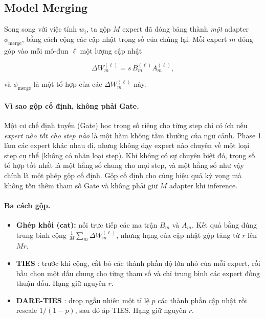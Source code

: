 \documentclass[12pt,a4paper]{article}
\newcommand{\pmerge}{\phi_{\mathrm{merge}}}
\begin{document}
\subsection{Model Merging}
\label{sec:merging}

Song song với việc tính $w_i$, ta gộp $M$ expert đã đóng băng thành \emph{một} adapter $\pmerge$, bằng cách cộng các cập nhật trọng số của chúng lại. Mỗi expert $m$ đóng góp vào mỗi mô-đun $\ell$ một lượng cập nhật

\begin{equation}
\label{eq:deltaw}
\Delta W_m^{(\ell)} = s\, B_m^{(\ell)} A_m^{(\ell)},
\end{equation}

và $\pmerge$ là một tổ hợp của các $\Delta W_m^{(\ell)}$ này.

\paragraph{Vì sao gộp cố định, không phải Gate.}
Một cơ chế định tuyến (Gate) học trọng số riêng cho từng step chỉ có ích nếu \emph{expert nào tốt cho step nào} là một hàm không tầm thường của ngữ cảnh. Phase 1 làm các expert khác nhau đi, nhưng không dạy expert nào chuyên về một loại step cụ thể (không có nhãn loại step). Khi không có sự chuyên biệt đó, trọng số tổ hợp tốt nhất là một hằng số chung cho mọi step, và một hằng số như vậy chính là một phép gộp cố định. Gộp cố định cho cùng hiệu quả kỳ vọng mà không tốn thêm tham số Gate và không phải giữ $M$ adapter khi inference.

\paragraph{Ba cách gộp.}
\begin{itemize}
\item \textbf{Ghép khối (cat):} nối trực tiếp các ma trận $B_m$ và $A_m$. Kết quả bằng đúng trung bình cộng $\frac{1}{M}\sum_m \Delta W_m^{(\ell)}$, nhưng hạng của cập nhật gộp tăng từ $r$ lên $Mr$.
\item \textbf{TIES} \cite{yadav2023ties}: trước khi cộng, cắt bỏ các thành phần độ lớn nhỏ của mỗi expert, rồi bầu chọn một dấu chung cho từng tham số và chỉ trung bình các expert đồng thuận dấu. Hạng giữ nguyên $r$.
\item \textbf{DARE-TIES} \cite{yu2024dare}: drop ngẫu nhiên một tỉ lệ $p$ các thành phần cập nhật rồi rescale $1/(1-p)$, sau đó áp TIES. Hạng giữ nguyên $r$.
\end{itemize}
\end{document}
